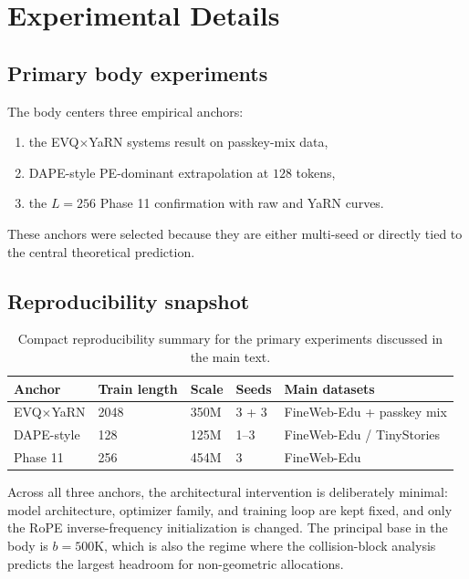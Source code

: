 \section{Experimental Details}

\subsection{Primary body experiments}

The body centers three empirical anchors:
\begin{enumerate}
\item the EVQ\(\times\)YaRN systems result on passkey-mix data,
\item DAPE-style PE-dominant extrapolation at \(128\) tokens,
\item the \(L=256\) Phase 11 confirmation with raw and YaRN curves.
\end{enumerate}
These anchors were selected because they are either multi-seed or directly tied to the central theoretical prediction.

\subsection{Reproducibility snapshot}

\begin{table}[ht]
\caption{Compact reproducibility summary for the primary experiments discussed in the main text.}
\label{tab:appendix-repro}
\centering
\small
\begin{tabular}{@{}lllll@{}}
\toprule
Anchor & Train length & Scale & Seeds & Main datasets \\
\midrule
EVQ\(\times\)YaRN & 2048 & 350M & 3 + 3 & FineWeb-Edu + passkey mix \\
DAPE-style & 128 & 125M & 1--3 & FineWeb-Edu / TinyStories \\
Phase 11 & 256 & 454M & 3 & FineWeb-Edu \\
\bottomrule
\end{tabular}
\end{table}

Across all three anchors, the architectural intervention is deliberately minimal: model architecture, optimizer family, and training loop are kept fixed, and only the RoPE inverse-frequency initialization is changed. The principal base in the body is \(b=500\mathrm{K}\), which is also the regime where the collision-block analysis predicts the largest headroom for non-geometric allocations.

